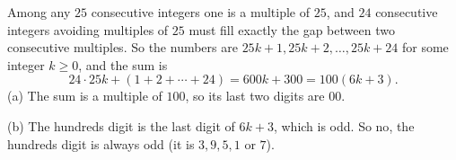 Among any $25$ consecutive integers one is a multiple of $25$, and $24$ consecutive integers avoiding multiples of $25$ must fill exactly the gap between two consecutive multiples. So the numbers are $25k+1,25k+2,\dots,25k+24$ for some integer $k\ge0$, and the sum is
\[
24\cdot25k+(1+2+\cdots+24)=600k+300=100(6k+3).
\]
(a) The sum is a multiple of $100$, so its last two digits are $\boxed{00}$.

(b) The hundreds digit is the last digit of $6k+3$, which is odd. So $\boxed{\text{no}}$, the hundreds digit is always odd (it is $3,9,5,1$ or $7$).
